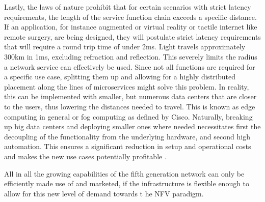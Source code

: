 Lastly, the laws of nature prohibit that for certain scenarios with strict latency requirements, the length of the service function chain exceeds a specific distance. If an application, for instance augmented or virtual reality or tactile internet like remote surgery, are being designed, they will postulate strict latency requirements that will require a round trip time of under 2ms. Light travels approximately 300km in 1ms, excluding refraction and reflection. This severely limits the radius a network service can effectively be used. Since not all functions are required for a specific use case, splitting them up and allowing for a highly distributed placement along the lines of microservices might solve this problem. In reality, this can be implemented with smaller, but numerous data centers that are closer to the users, thus lowering the distances needed to travel. This is known as edge computing in general or fog computing as defined by Cisco. Naturally, breaking up big data centers and deploying smaller ones where needed necessitates first the decoupling of the functionality from the underlying hardware, and second high automation. This ensures a significant reduction in setup and operational costs and makes the new use cases potentially profitable \cite{cn5gvnf} \cite{nfv_wp} \cite{ordonez2017network} \cite{nfv_etsi} \cite{abdelwahab2016network} \cite{nfv5g} \cite{alexgalis2018multi} \cite{alexgalis2017analysis} \cite{de2019network} \cite{condoluci2018softwarization}. 

All in all the growing capabilities of the fifth generation network can only be efficiently made use of and marketed, if the infrastructure is flexible enough to allow for this new level of demand towards t he NFV paradigm. 

